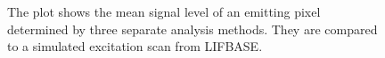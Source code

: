 \begin{figure}

\centering



\caption[Results of the excitation scan experiment]{The plot shows the mean signal level of an emitting pixel determined by three separate analysis methods. They are compared to a simulated excitation scan from LIFBASE.}

\label{fig:excitationScanResults}

\end{figure}

